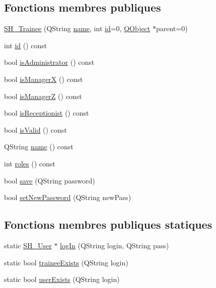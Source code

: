 \subsection*{Fonctions membres publiques}
\begin{DoxyCompactItemize}
\item 
\hyperlink{classSH__Trainee_a4317a6d68ef014c66082943c63404a31}{S\-H\-\_\-\-Trainee} (Q\-String \hyperlink{classSH__User_ae32b20d52e62ec32c1f335006f52214e}{name}, int \hyperlink{classSH__User_a187ee34e1d6d3466f3852e091cdb69e9}{id}=0, \hyperlink{classQObject}{Q\-Object} $\ast$parent=0)
\item 
int \hyperlink{classSH__User_addf3cb1d491eea2df592dee5c9081d32}{id} () const 
\item 
bool \hyperlink{classSH__User_a2a9cbd9e27e5047ec108d4f373884de5}{is\-Administrator} () const 
\item 
bool \hyperlink{classSH__User_af5e5639aa5f7794b5b169f0ed0333268}{is\-Manager\-X} () const 
\item 
bool \hyperlink{classSH__User_a763479597c54bb92ad2490826dedacfa}{is\-Manager\-Z} () const 
\item 
bool \hyperlink{classSH__User_a6e78a5559a202eb3f2bd79e50768da7f}{is\-Receptionist} () const 
\item 
bool \hyperlink{classSH__User_a07de5c02b2a02b3bb2b0aaf0886bb4d9}{is\-Valid} () const 
\item 
Q\-String \hyperlink{classSH__User_ae91e70207f4057846667af6e1c300d96}{name} () const 
\item 
int \hyperlink{classSH__User_a4b58db36176601136130aa91e87548ee}{roles} () const 
\item 
bool \hyperlink{classSH__Trainee_ac118976aaa960a727127370e625a3bb9}{save} (Q\-String password)
\item 
bool \hyperlink{classSH__User_ada3160c3abf1b200646cb6f4fe5ccd72}{set\-New\-Password} (Q\-String new\-Pass)
\end{DoxyCompactItemize}
\subsection*{Fonctions membres publiques statiques}
\begin{DoxyCompactItemize}
\item 
static \hyperlink{classSH__User}{S\-H\-\_\-\-User} $\ast$ \hyperlink{classSH__User_a98e3e3ca706a6988e6d7af23ce8bb82a}{log\-In} (Q\-String login, Q\-String pass)
\item 
static bool \hyperlink{classSH__User_adfc35c967cb405f4a14886676612fbb7}{trainee\-Exists} (Q\-String login)
\item 
static bool \hyperlink{classSH__User_a64161b35866b1c635d5f4214095a2b1e}{user\-Exists} (Q\-String login)
\end{DoxyCompactItemize}
